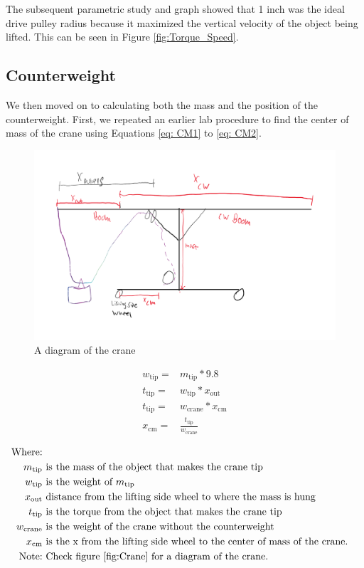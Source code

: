 \documentclass[letterpaper, 12pt]{article}
\begin{document}
The subsequent parametric study and graph showed that 1 inch was the ideal drive pulley radius because it maximized the vertical velocity of the object being lifted.  This can be seen in Figure \ref{fig:Torque_Speed}.

\subsection{Counterweight}
We then moved on to calculating both the mass and the position of the counterweight. 
First, we repeated an earlier lab procedure to find the center of mass of the crane using Equations \ref{eq: CM1} to \ref{eq: CM2}.
\begin{figure}[H]
    \centering
    \includegraphics[width =0.6\linewidth]{null (3).png}
    \caption{A diagram of the crane}
    \label{fig:Crane}
\end{figure}

\begin{align}
        w_{\text{tip}}= & m_{\text{tip}} * 9.8 \label{eq: CM1} \\ 
        t_{\text{tip}}= & w_{\text{tip}}*x_{\text{out}}\label{eq:Torque 1} \\ 
        t_{\text{tip}}= & w_{\text{crane}}*x_{\text{cm}}\label{eq:Torque 2} \\
        x_{\text{cm}}= & \frac{t_{\text{tip}}}{w_{\text{crane}}} \label{eq: CM2}
\end{align}

\begin{equation}
    \begin{split}
        \text{Where:} \\
        m_{\text{tip}} & \text{ is the mass of the object that makes the crane tip} \\
        w_{\text{tip}} & \text{ is the weight of } m_{\text{tip}} \\
        x_{\text{out}} & \text{ distance from the lifting side wheel to where the mass is hung} \\
        t_{\text{tip}} & \text{ is the torque from the object that makes the crane tip} \\
        w_{\text{crane}} & \text{ is the weight of the crane without the counterweight} \\
        x_{\text{cm}} & \text{ is the x from the lifting side wheel to the center of mass of the crane.} \\
        \text{Note:} & \text{ Check figure \ref{fig:Crane} for a diagram of the crane.}
    \end{split}
\end{equation}
\end{document}

